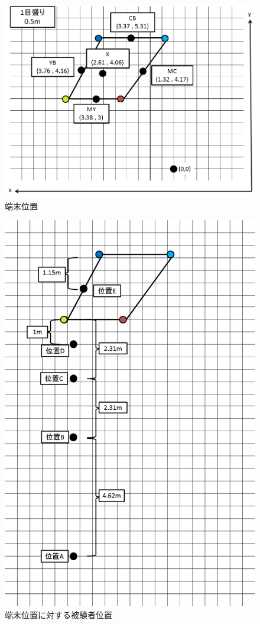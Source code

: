 \begin{figure}[p]
  \centering
  \includegraphics[clip,width=1.05\hsize]{img/ongenichi.png}
  \caption{端末位置}\label{fig:hikenshaichi}
\end{figure}

\begin{figure}[p]
  \centering
  \includegraphics[clip,width=1.05\hsize]{img/hikenshaichi.png}
  \caption{端末位置に対する被験者位置}\label{fig:hikenshaichi}
\end{figure}


